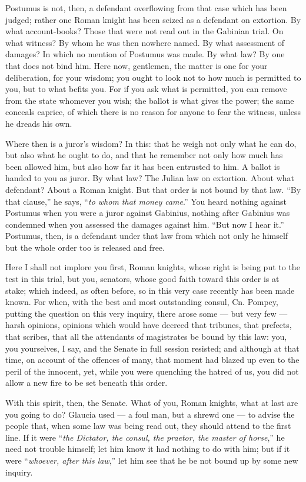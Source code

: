  Postumus is not, then, a defendant overflowing from that case which has been judged; rather one Roman knight has been seized as a defendant on extortion. By what account-books? Those that were not read out in the Gabinian trial. On what witness? By whom he was then nowhere named. By what assessment of damages? In which no mention of Postumus was made. By what law? By one that does not bind him. Here now, gentlemen, the matter is one for your deliberation, for your wisdom; you ought to look not to how much is permitted to you, but to what befits you. For if you ask what is permitted, you can remove from the state whomever you wish; the ballot is what gives the power; the same conceals caprice, of which there is no reason for anyone to fear the witness, unless he dreads his own.

 Where then is a juror's wisdom? In this: that he weigh not only what he can do, but also what he ought to do, and that he remember not only how much has been allowed him, but also how far it has been entrusted to him. A ballot is handed to you as juror. By what law? The Julian law on extortion. About what defendant? About a Roman knight. But that order is not bound by that law. ``By that clause,'' he says, ``\textit{to whom that money came}.'' You heard nothing against Postumus when you were a juror against Gabinius, nothing after Gabinius was condemned when you assessed the damages against him. ``But now I hear it.'' Postumus, then, is a defendant under that law from which not only he himself but the whole order too is released and free.

 Here I shall not implore you first, Roman knights, whose right is being put to the test in this trial, but you, senators, whose good faith toward this order is at stake; which indeed, as often before, so in this very case recently has been made known. For when, with the best and most outstanding consul, Cn. Pompey, putting the question on this very inquiry, there arose some --- but very few --- harsh opinions, opinions which would have decreed that tribunes, that prefects, that scribes, that all the attendants of magistrates be bound by this law: you, you yourselves, I say, and the Senate in full session resisted; and although at that time, on account of the offences of many, that moment had blazed up even to the peril of the innocent, yet, while you were quenching the hatred of us, you did not allow a new fire to be set beneath this order.

 With this spirit, then, the Senate. What of you, Roman knights, what at last are you going to do? Glaucia used --- a foul man, but a shrewd one --- to advise the people that, when some law was being read out, they should attend to the first line. If it were ``\textit{the Dictator, the consul, the praetor, the master of horse},'' he need not trouble himself; let him know it had nothing to do with him; but if it were ``\textit{whoever, after this law},'' let him see that he be not bound up by some new inquiry.

